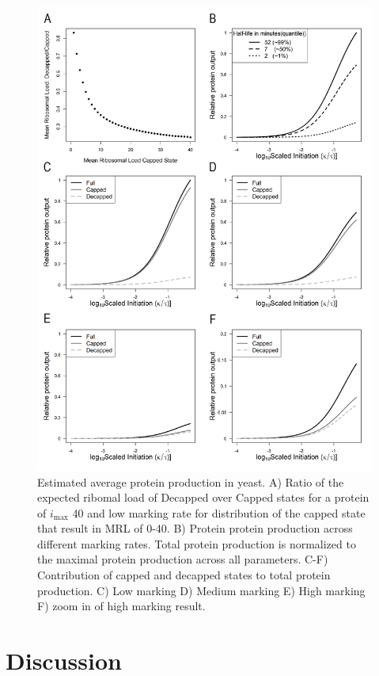 \documentclass[review]{elsarticle}
\newcommand{\imax}{\ensuremath{i_{\max}}\xspace}
\begin{document}
\begin{figure}[!ht]
\centering
\includegraphics[width = 135mm]{Images/2023-07-17_Protein_Production.png}
\caption{Estimated average protein production in yeast. A) Ratio of the expected ribomal load of Decapped over Capped states for a protein of \imax 40 and low marking rate for distribution of the capped state that result in MRL of 0-40. B) Protein protein production across different marking rates. Total protein production is normalized to the maximal protein production across all parameters. C-F) Contribution of capped and decapped states to total protein production. C) Low marking D) Medium marking E) High marking F) zoom in of high marking result. }
\end{figure}
\clearpage

\section{Discussion}
\end{document}
